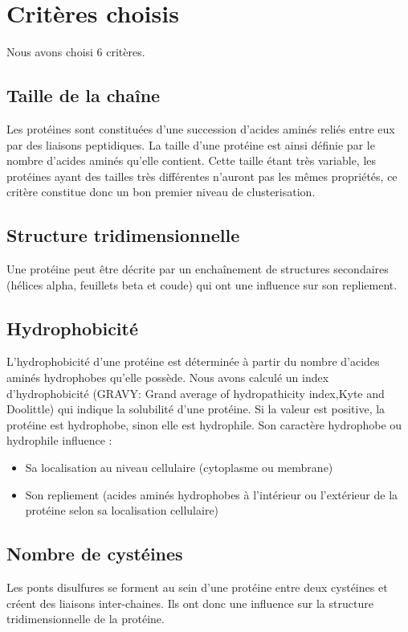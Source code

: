 \section*{Critères choisis}
Nous avons choisi 6 critères.

\subsection*{Taille de la chaîne}
Les protéines sont constituées d'une succession d'acides aminés reliés entre eux par des liaisons peptidiques. La taille d'une protéine est ainsi définie par le nombre d'acides aminés qu'elle contient. Cette taille étant très variable, les protéines ayant des tailles très différentes n'auront pas les m\^emes propriétés, ce critère constitue donc un bon premier niveau de clusterisation.

\subsection*{Structure tridimensionnelle}
Une protéine peut être décrite par un enchaînement de structures secondaires (hélices alpha, feuillets beta et coude) qui ont une influence sur son repliement.\\

\subsection*{Hydrophobicité}
L'hydrophobicité d'une protéine est déterminée à partir du nombre d'acides aminés hydrophobes qu'elle possède.
Nous avons calculé un index d'hydrophobicité (GRAVY: Grand average of hydropathicity index,Kyte and Doolittle) qui indique la solubilité d'une protéine. Si la valeur est positive, la protéine est hydrophobe, sinon elle est hydrophile.
Son caractère hydrophobe ou hydrophile influence :
\begin{itemize}
\item Sa localisation au niveau cellulaire (cytoplasme ou membrane)
\item Son repliement (acides aminés hydrophobes à l'intérieur ou l'extérieur de la protéine selon sa localisation cellulaire) 
\end{itemize}


\subsection*{Nombre de cystéines}
Les ponts disulfures se forment au sein d'une protéine entre deux cystéines et créent des liaisons inter-chaines. Ils ont donc une influence sur la structure tridimensionnelle de la protéine.\\

